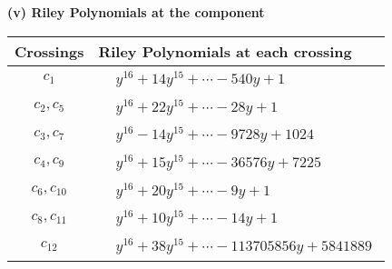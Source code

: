 \documentclass[1p]{elsarticle_modified}
\theoremstyle{definition}
\begin{document}
\flushleft \textbf{(v) Riley Polynomials at the component}\newline \\
\begin{tabular}{m{50pt}|m{274pt}}
Crossings & \hspace{64pt}Riley Polynomials at each crossing \\
\hline $$\begin{aligned}c_{1}\end{aligned}$$&$\begin{aligned}
&y^{16}+14 y^{15}+\cdots-540 y+1
\end{aligned}$\\
\hline $$\begin{aligned}c_{2},c_{5}\end{aligned}$$&$\begin{aligned}
&y^{16}+22 y^{15}+\cdots-28 y+1
\end{aligned}$\\
\hline $$\begin{aligned}c_{3},c_{7}\end{aligned}$$&$\begin{aligned}
&y^{16}-14 y^{15}+\cdots-9728 y+1024
\end{aligned}$\\
\hline $$\begin{aligned}c_{4},c_{9}\end{aligned}$$&$\begin{aligned}
&y^{16}+15 y^{15}+\cdots-36576 y+7225
\end{aligned}$\\
\hline $$\begin{aligned}c_{6},c_{10}\end{aligned}$$&$\begin{aligned}
&y^{16}+20 y^{15}+\cdots-9 y+1
\end{aligned}$\\
\hline $$\begin{aligned}c_{8},c_{11}\end{aligned}$$&$\begin{aligned}
&y^{16}+10 y^{15}+\cdots-14 y+1
\end{aligned}$\\
\hline $$\begin{aligned}c_{12}\end{aligned}$$&$\begin{aligned}
&y^{16}+38 y^{15}+\cdots-113705856 y+5841889
\end{aligned}$\\
\hline
\end{tabular}\\~\\
\end{document}
